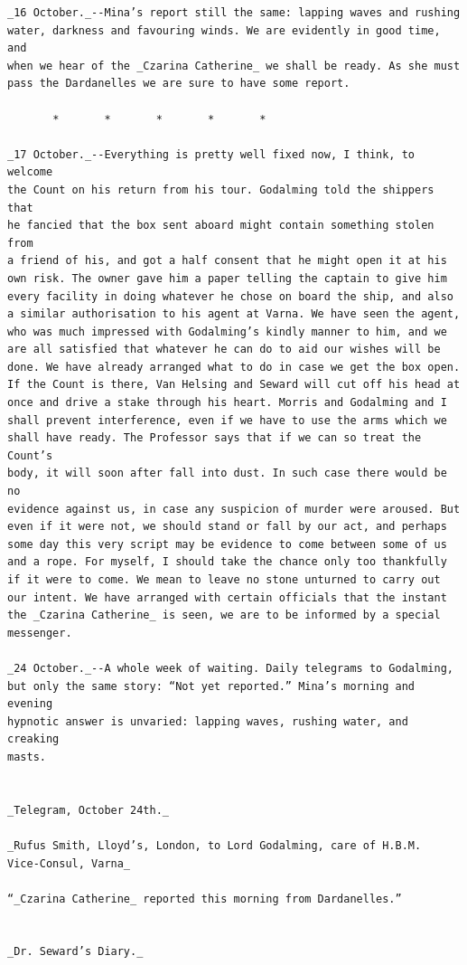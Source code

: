 \documentclass{article}
\begin{document}
\begin{verbatim}
_16 October._--Mina’s report still the same: lapping waves and rushing
water, darkness and favouring winds. We are evidently in good time, and
when we hear of the _Czarina Catherine_ we shall be ready. As she must
pass the Dardanelles we are sure to have some report.

       *       *       *       *       *

_17 October._--Everything is pretty well fixed now, I think, to welcome
the Count on his return from his tour. Godalming told the shippers that
he fancied that the box sent aboard might contain something stolen from
a friend of his, and got a half consent that he might open it at his
own risk. The owner gave him a paper telling the captain to give him
every facility in doing whatever he chose on board the ship, and also
a similar authorisation to his agent at Varna. We have seen the agent,
who was much impressed with Godalming’s kindly manner to him, and we
are all satisfied that whatever he can do to aid our wishes will be
done. We have already arranged what to do in case we get the box open.
If the Count is there, Van Helsing and Seward will cut off his head at
once and drive a stake through his heart. Morris and Godalming and I
shall prevent interference, even if we have to use the arms which we
shall have ready. The Professor says that if we can so treat the Count’s
body, it will soon after fall into dust. In such case there would be no
evidence against us, in case any suspicion of murder were aroused. But
even if it were not, we should stand or fall by our act, and perhaps
some day this very script may be evidence to come between some of us
and a rope. For myself, I should take the chance only too thankfully
if it were to come. We mean to leave no stone unturned to carry out
our intent. We have arranged with certain officials that the instant
the _Czarina Catherine_ is seen, we are to be informed by a special
messenger.

_24 October._--A whole week of waiting. Daily telegrams to Godalming,
but only the same story: “Not yet reported.” Mina’s morning and evening
hypnotic answer is unvaried: lapping waves, rushing water, and creaking
masts.


_Telegram, October 24th._

_Rufus Smith, Lloyd’s, London, to Lord Godalming, care of H.B.M.
Vice-Consul, Varna_

“_Czarina Catherine_ reported this morning from Dardanelles.”


_Dr. Seward’s Diary._


\end{verbatim}
\end{document}

